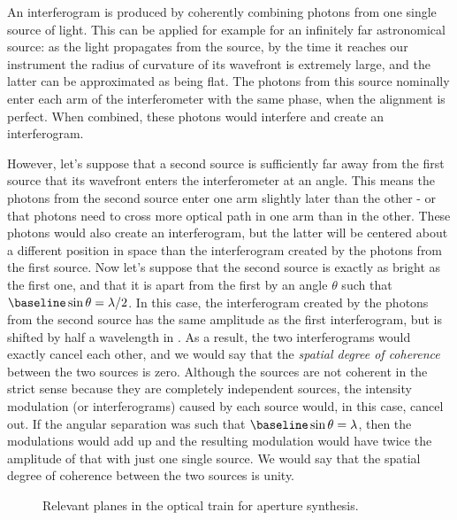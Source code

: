 An interferogram is produced by coherently combining photons from one single source of light. This can be applied for example for an infinitely far astronomical source: as the light propagates from the source, by the time it reaches our instrument the radius of curvature of its wavefront is extremely large, and the latter can be approximated as being flat. The photons from this source nominally enter each arm of the interferometer with the same phase, when the alignment is perfect. When combined, these photons would interfere and create an interferogram.




However, let's suppose that a second source is sufficiently far away from the first source that its wavefront enters the interferometer at an angle. This means the photons from the second source enter one arm slightly later than the other - or that photons need to cross more optical path in one arm than in the other. These photons would also create an interferogram, but the latter will be centered about a different position in \OPD  space than the interferogram created by the photons from the first source. Now let's suppose that the second source is exactly as bright as the first one, and that it is apart from the first by an angle $\theta$ such that $\baseline\sin\theta = \lambda/2$. In this case,  the interferogram created by the photons from the second source has the same amplitude as the first interferogram, but is shifted by half a wavelength in \OPD. As a result, the two interferograms would exactly cancel each other, and we would say that the \textit{spatial degree of coherence} between the two sources is zero. Although the sources are not coherent in the strict sense because they are completely independent sources, the intensity modulation (or interferograms) caused by each source would, in this case, cancel out. If the angular separation was such that $\baseline\sin\theta = \lambda$, then the modulations would add up and the resulting modulation would have twice the amplitude of that with just one single source. We would say that the spatial degree of coherence between the two sources is unity. 

\begin{figure}[!h]
	\centering
	
	\caption[Aperture synthesis]{Relevant planes in the optical train for aperture synthesis.}
	\label{fig:aperturesynthesis}
    \end{figure}



